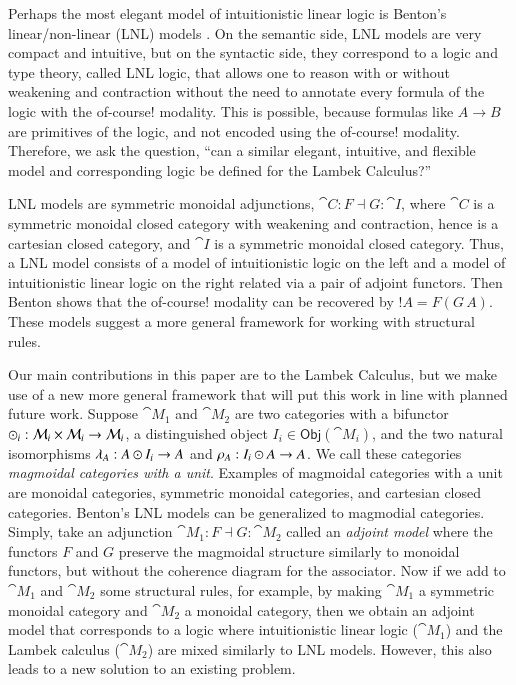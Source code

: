 Perhaps the most elegant model of intuitionistic linear logic is
Benton's linear/non-linear (LNL) models \cite{Benton:1994}. On the
semantic side, LNL models are very compact and intuitive, but on the
syntactic side, they correspond to a logic and type theory, called LNL
logic, that allows one to reason with or without weakening and
contraction without the need to annotate every formula of the logic
with the of-course!  modality.  This is possible, because formulas
like $A \to B$ are primitives of the logic, and not encoded using the
of-course! modality.  Therefore, we ask the question, ``can a similar
elegant, intuitive, and flexible model and corresponding logic be
defined for the Lambek Calculus?''

LNL models are symmetric monoidal adjunctions, $\cat{C} : F \dashv G :
\cat{I}$, where $\cat{C}$ is a symmetric monoidal closed category with
weakening and contraction, hence is a cartesian closed category, and
$\cat{I}$ is a symmetric monoidal closed category.  Thus, a LNL model
consists of a model of intuitionistic logic on the left and a model of
intuitionistic linear logic on the right related via a pair of adjoint
functors.  Then Benton shows that the of-course! modality can be
recovered by $!A = F(G\,A)$.  These models suggest a more general
framework for working with structural rules.

Our main contributions in this paper are to the Lambek Calculus, but
we make use of a new more general framework that will put this work in
line with planned future work.  Suppose $\cat{M}_1$ and $\cat{M}_2$
are two categories with a bifunctor $\odot_i : \mathcal{M}_i \times
\mathcal{M}_i \rightarrow \mathcal{M}_i$, a distinguished object $I_i \in
\mathsf{Obj}(\cat{M}_i)$, and the two natural isomorphisms $\lambda_A
: A \odot I_i \rightarrow A$ and $\rho_A : I_i \odot A \rightarrow A$.  We call
these categories \emph{magmoidal categories with a unit}.  Examples of
magmoidal categories with a unit are monoidal categories, symmetric
monoidal categories, and cartesian closed categories.  Benton's LNL
models can be generalized to magmodial categories.  Simply, take an
adjunction $\cat{M}_1 : F \dashv G : \cat{M}_2$ called an
\emph{adjoint model} where the functors $F$ and $G$ preserve the
magmoidal structure similarly to monoidal functors, but without the
coherence diagram for the associator.  Now if we add to $\cat{M}_1$
and $\cat{M}_2$ some structural rules, for example, by making
$\cat{M}_1$ a symmetric monoidal category and $\cat{M}_2$ a monoidal
category, then we obtain an adjoint model that corresponds to a logic
where intuitionistic linear logic ($\cat{M}_1$) and the Lambek
calculus ($\cat{M}_2$) are mixed similarly to LNL models.  However,
this also leads to a new solution to an existing problem.

